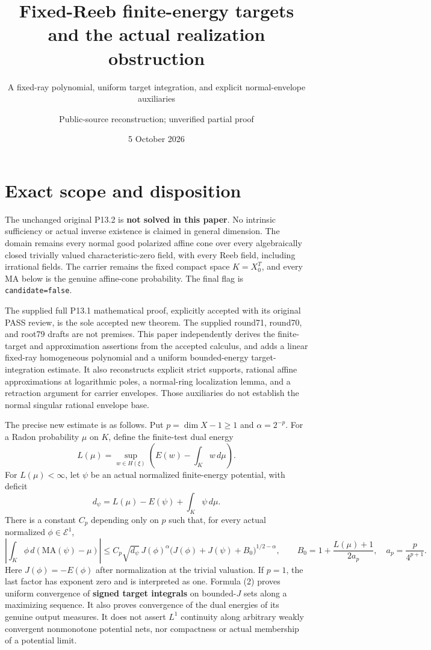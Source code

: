 \documentclass[
  10pt,
]{article}
\title{Fixed-Reeb finite-energy targets and the actual realization
obstruction}
\subtitle{A fixed-ray polynomial, uniform target integration, and
explicit normal-envelope auxiliaries}
\author{Public-source reconstruction; unverified partial proof}
\date{5 October 2026}
\begin{document}
\maketitle

\section{Exact scope and disposition}\label{exact-scope-and-disposition}

The unchanged original P13.2 is \textbf{not solved in this paper}. No
intrinsic sufficiency or actual inverse existence is claimed in general
dimension. The domain remains every normal good polarized affine cone
over every algebraically closed trivially valued characteristic-zero
field, with every Reeb field, including irrational fields. The carrier
remains the fixed compact space \(K=X_0^T\), and every MA below is the
genuine affine-cone probability. The final flag is
\texttt{candidate=false}.

The supplied full P13.1 mathematical proof, explicitly accepted with its
original PASS review, is the sole accepted new theorem. The supplied
round71, round70, and root79 drafts are not premises. This paper
independently derives the finite-target and approximation assertions
from the accepted calculus, and adds a linear fixed-ray homogeneous
polynomial and a uniform bounded-energy target-integration estimate. It
also reconstructs explicit strict supports, rational affine
approximations at logarithmic poles, a normal-ring localization lemma,
and a retraction argument for carrier envelopes. Those auxiliaries do
not establish the normal singular rational envelope base.

The precise new estimate is as follows. Put \(p=\dim X-1\ge1\) and
\(\alpha=2^{-p}\). For a Radon probability \(\mu\) on \(K\), define the
finite-test dual energy \[
 L(\mu)=\sup_{w\in H(\xi)}\left(E(w)-\int_Kw\,d\mu\right).
 \tag{1}
\] For \(L(\mu)<\infty\), let \(\psi\) be an actual normalized
finite-energy potential, with deficit
\[d_\psi=L(\mu)-E(\psi)+\int_K\psi\,d\mu.\] There is a constant \(C_p\)
depending only on \(p\) such that, for every actual normalized
\(\phi\in\mathcal E^1\), \[
 \left|\int_K\phi\,d(\mathrm{MA}(\psi)-\mu)\right|
 \le C_p\sqrt{d_\psi}\,J(\phi)^\alpha
       \big(J(\phi)+J(\psi)+B_0\big)^{1/2-\alpha},
 \qquad B_0=1+\frac{L(\mu)+1}{2a_p},\quad a_p=\frac p{4^{p+1}}.
 \tag{2}
\] Here \(J(\phi)=-E(\phi)\) after normalization at the trivial
valuation. If \(p=1\), the last factor has exponent zero and is
interpreted as one. Formula (2) proves uniform convergence of
\textbf{signed target integrals} on bounded-\(J\) sets along a
maximizing sequence. It also proves convergence of the dual energies of
its genuine output measures. It does not assert \(L^1\) continuity along
arbitrary weakly convergent nonmonotone potential nets, nor compactness
or actual membership of a potential limit.
\end{document}
